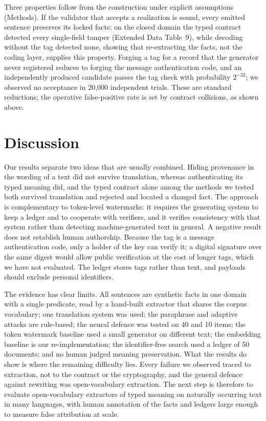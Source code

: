 \documentclass[12pt]{article}
\begin{document}
Three properties follow from the construction under explicit assumptions (Methods). If the validator that accepts a realization is sound, every emitted sentence preserves its locked facts; on the closed domain the typed contract detected every single-field tamper (Extended Data Table~9), while decoding without the tag detected none, showing that re-extracting the facts, not the coding layer, supplies this property. Forging a tag for a record that the generator never registered reduces to forging the message authentication code, and an independently produced candidate passes the tag check with probability $2^{-32}$; we observed no acceptance in 20,000 independent trials. These are standard reductions; the operative false-positive rate is set by contract collisions, as shown above.

\section*{Discussion}

Our results separate two ideas that are usually combined. Hiding provenance in the wording of a text did not survive translation, whereas authenticating its typed meaning did, and the typed contract alone among the methods we tested both survived translation and rejected and located a changed fact. The approach is complementary to token-level watermarks: it requires the generating system to keep a ledger and to cooperate with verifiers, and it verifies consistency with that system rather than detecting machine-generated text in general. A negative result does not establish human authorship. Because the tag is a message authentication code, only a holder of the key can verify it; a digital signature over the same digest would allow public verification at the cost of longer tags\cite{liu2024unforgeable}, which we have not evaluated. The ledger stores tags rather than text, and payloads should exclude personal identifiers.

The evidence has clear limits. All sentences are synthetic facts in one domain with a single predicate, read by a hand-built extractor that shares the corpus vocabulary; one translation system was used; the paraphrase and adaptive attacks are rule-based; the neural defence was tested on 40 and 10 items; the token watermark baseline used a small generator on different text; the embedding baseline is our re-implementation; the identifier-free search used a ledger of 50 documents; and no human judged meaning preservation. What the results do show is where the remaining difficulty lies. Every failure we observed traced to extraction, not to the contract or the cryptography, and the general defence against rewriting was open-vocabulary extraction. The next step is therefore to evaluate open-vocabulary extractors of typed meaning on naturally occurring text in many languages, with human annotation of the facts and ledgers large enough to measure false attribution at scale.
\end{document}

